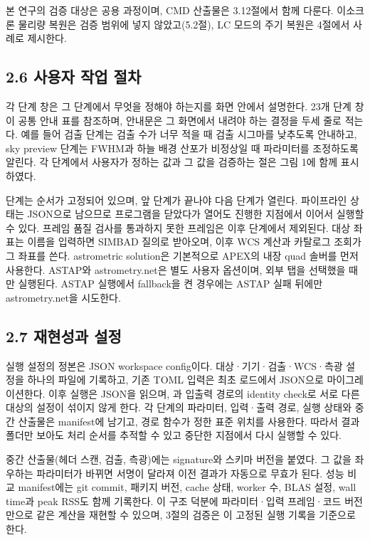 본 연구의 검증 대상은 공용 과정이며, CMD 산출물은 3.12절에서 함께 다룬다. 이소크론 물리량 복원은 검증 범위에 넣지 않았고(5.2절), LC 모드의 주기 복원은 4절에서 사례로 제시한다.



\subsection{2.6 사용자 작업 절차}

각 단계 창은 그 단계에서 무엇을 정해야 하는지를 화면 안에서 설명한다. 23개 단계 창이 공통 안내 표를 참조하며, 안내문은 그 화면에서 내려야 하는 결정을 두세 줄로 적는다. 예를 들어 검출 단계는 검출 수가 너무 적을 때 검출 시그마를 낮추도록 안내하고, sky preview 단계는 FWHM과 하늘 배경 산포가 비정상일 때 파라미터를 조정하도록 알린다. 각 단계에서 사용자가 정하는 값과 그 값을 검증하는 절은 그림 1에 함께 표시하였다.



단계는 순서가 고정되어 있으며, 앞 단계가 끝나야 다음 단계가 열린다. 파이프라인 상태는 JSON으로 남으므로 프로그램을 닫았다가 열어도 진행한 지점에서 이어서 실행할 수 있다. 프레임 품질 검사를 통과하지 못한 프레임은 이후 단계에서 제외된다. 대상 좌표는 이름을 입력하면 SIMBAD 질의로 받아오며, 이후 WCS 계산과 카탈로그 조회가 그 좌표를 쓴다. astrometric solution은 기본적으로 APEX의 내장 quad 솔버를 먼저 사용한다. ASTAP와 astrometry.net은 별도 사용자 옵션이며, 외부 탭을 선택했을 때만 실행된다. ASTAP 실행에서 fallback을 켠 경우에는 ASTAP 실패 뒤에만 astrometry.net을 시도한다.



\subsection{2.7 재현성과 설정}

실행 설정의 정본은 JSON workspace config이다. 대상·기기·검출·WCS·측광 설정을 하나의 파일에 기록하고, 기존 TOML 입력은 최초 로드에서 JSON으로 마이그레이션한다. 이후 실행은 JSON을 읽으며, \texttt{}과 입출력 경로의 identity check로 서로 다른 대상의 설정이 섞이지 않게 한다. 각 단계의 파라미터, 입력·출력 경로, 실행 상태와 중간 산출물은 manifest에 남기고, 경로 함수가 정한 표준 위치를 사용한다. 따라서 결과 폴더만 보아도 처리 순서를 추적할 수 있고 중단한 지점에서 다시 실행할 수 있다.



중간 산출물(헤더 스캔, 검출, 측광)에는 signature와 스키마 버전을 붙였다. 그 값을 좌우하는 파라미터가 바뀌면 서명이 달라져 이전 결과가 자동으로 무효가 된다. 성능 비교 manifest에는 git commit, 패키지 버전, cache 상태, worker 수, BLAS 설정, wall time과 peak RSS도 함께 기록한다. 이 구조 덕분에 파라미터·입력 프레임·코드 버전만으로 같은 계산을 재현할 수 있으며, 3절의 검증은 이 고정된 실행 기록을 기준으로 한다.



